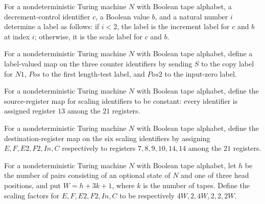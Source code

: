 \begin{definition}
\label{Complexity.Codec.dcIncs}
\leanok
{}
For a nondeterministic Turing machine $N$ with Boolean tape alphabet, a
decrement-control identifier $c$, a Boolean value $b$, and a natural number $i$
determine a label as follows: if $i<2$, the label is the increment label for $c$ and $b$
at index $i$; otherwise, it is the scale label for $c$ and $b$.
\end{definition}

\begin{definition}
\label{Complexity.Codec.dcNext}
\leanok
{}
For a nondeterministic Turing machine $N$ with Boolean tape alphabet, define a
label-valued map on the three counter identifiers by sending $S$ to the copy label for
$N1$, $Pos$ to the first length-test label, and $Pos2$ to the input-zero label.
\end{definition}

\begin{definition}
\label{Complexity.Codec.scSrc}
\leanok
{}
For a nondeterministic Turing machine $N$ with Boolean tape alphabet, define the
source-register map for scaling identifiers to be constant: every identifier is assigned
register $13$ among the $21$ registers.
\end{definition}

\begin{definition}
\label{Complexity.Codec.scDst}
\leanok
{}
For a nondeterministic Turing machine $N$ with Boolean tape alphabet, define the
destination-register map on the six scaling identifiers by assigning $E,F,E2,F2,In,C$
respectively to registers $7,8,9,10,14,14$ among the $21$ registers.
\end{definition}

\begin{definition}
\label{Complexity.Codec.scFactor}
\leanok
{}
For a nondeterministic Turing machine $N$ with Boolean tape alphabet, let $h$ be the
number of pairs consisting of an optional state of $N$ and one of three head positions,
and put $W=h+3k+1$, where $k$ is the number of tapes. Define the scaling factors for
$E,F,E2,F2,In,C$ to be respectively $4W,2,4W,2,2,2W$.
\end{definition}

